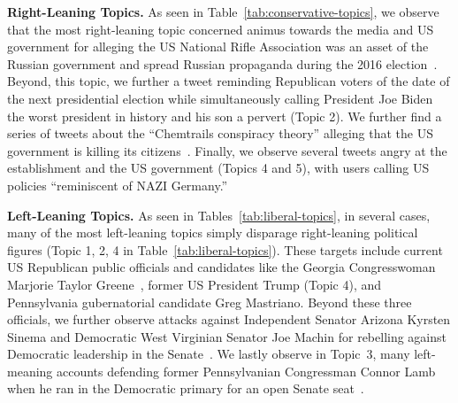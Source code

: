 \vspace{2pt}
\noindent
\textbf{Right-Leaning Topics.} As seen in Table~\ref{tab:conservative-topics}, we observe that the most right-leaning topic concerned animus towards the media and US government for alleging the US National Rifle Association was an asset of the Russian government and spread Russian propaganda during the 2016 election~\cite{Mack2019}. Beyond, this topic, we further a tweet reminding Republican voters of the date of the next presidential election while simultaneously calling President Joe Biden the worst president in history and his son a pervert (Topic 2). We further find a series of tweets about the ``Chemtrails conspiracy theory'' alleging that the US government is killing its citizens~\cite{xiao2021sensemaking}. Finally, we observe several tweets angry at the establishment and the US government (Topics 4 and 5), with users calling US policies ``reminiscent of NAZI Germany.''


\vspace{2pt}
\noindent
\textbf{Left-Leaning Topics.}
As seen in Tables~\ref{tab:liberal-topics}, in several cases, many of the most left-leaning topics simply disparage right-leaning political figures (Topic 1, 2, 4 in Table~\ref{tab:liberal-topics}). These targets include current US Republican public officials and candidates like the Georgia Congresswoman Marjorie Taylor Greene~\cite{Donnelly2022}, former US President Trump (Topic 4), and Pennsylvania gubernatorial candidate Greg Mastriano. Beyond these three officials, we further observe attacks against Independent Senator Arizona Kyrsten Sinema and Democratic West Virginian Senator Joe Machin for rebelling against Democratic leadership in the Senate~\cite{Teh2022}. We lastly observe in Topic~3, many left-meaning accounts defending former Pennsylvanian Congressman Connor Lamb when he ran in the Democratic primary for an open Senate seat~\cite{Zipkin2022}.


